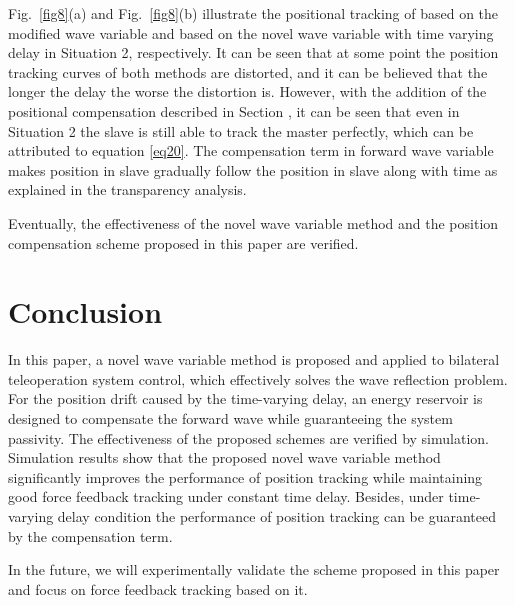 \par Fig.~\ref{fig8}(a) and Fig.~\ref{fig8}(b) illustrate the positional tracking of based on
the modified wave variable and based on the novel wave variable
with time varying delay in Situation 2, respectively.
It can be seen that
at some point the position tracking curves of both methods are distorted,
and it can be believed that the longer the delay the worse the distortion is.
However, with the addition of the positional compensation described in Section \uppercase\expandafter{} ,
it can be seen that even in Situation 2 the slave is still able to track the master perfectly,
which can be attributed to equation \eqref{eq20}.
The compensation term in forward wave variable makes position
in slave gradually follow the position in slave along with time
as explained in the transparency analysis.
\par Eventually,
the effectiveness of the novel wave variable method and the position compensation scheme proposed
in this paper are verified.


\section{Conclusion}
In this paper,
a novel wave variable method is proposed and applied to bilateral teleoperation system control,
which effectively solves the wave reflection problem. For the position drift caused by the time-varying delay,
an energy reservoir is designed to compensate the forward wave while guaranteeing the system passivity.
The effectiveness of the proposed schemes are verified by simulation.
Simulation results show that the proposed novel wave variable method
significantly improves the performance of position tracking
while maintaining good force feedback tracking under constant time delay.
Besides, under time-varying delay condition
the performance of position tracking can be guaranteed by the compensation term.
\par In the future,
we will experimentally validate the scheme proposed in this paper and
focus on force feedback tracking based on it.


